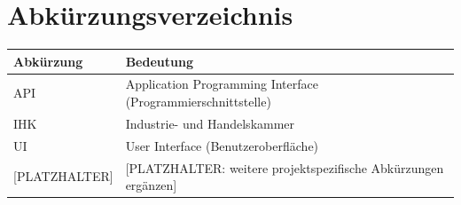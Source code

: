 \chapter*{Abk\"urzungsverzeichnis}

\begin{table}[h!]
  \centering
  \begin{tabular}{@{}ll@{}}
    \toprule
    \textbf{Abk\"urzung} & \textbf{Bedeutung} \\
    \midrule
    API   & Application Programming Interface (Programmierschnittstelle) \\
    IHK   & Industrie- und Handelskammer \\
    UI    & User Interface (Benutzeroberfl\"ache) \\
    {[}PLATZHALTER{]} & [PLATZHALTER: weitere projektspezifische Abk\"urzungen erg\"anzen] \\
    \bottomrule
  \end{tabular}
\end{table}
